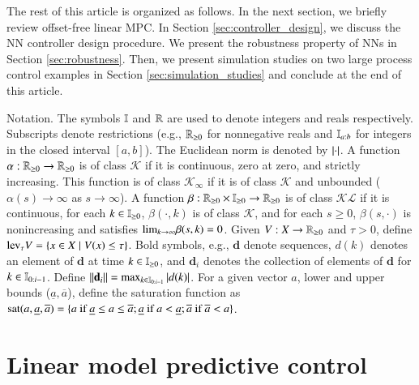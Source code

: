 \documentclass[preprint,5p, twocolumn, authoryear]{elsarticle}
\begin{document}
The rest of this article is organized as follows. 
In the next section, we briefly review 
offset-free linear MPC. 
In Section \ref{sec:controller_design},
we discuss the NN 
controller design procedure.
We present the robustness property
of NNs in Section \ref{sec:robustness}.
Then, we present simulation studies
on two large process control examples
in Section \ref{sec:simulation_studies}
and conclude at the end of this article.

Notation. The symbols $\mathbb{I}$ and $\mathbb{R}$ are 
used to denote integers and reals respectively. 
Subscripts denote restrictions 
(e.g., $\mathbb{R}_{\geq 0}$ for nonnegative reals and 
$\mathbb{I}_{a:b}$ for integers in the 
closed interval $[a, b]$). The Euclidean norm 
is denoted by $\left| \cdot \right|$. A function 
$\alpha : \mathbb{R}_{\geq 0} \rightarrow \mathbb{R}_{\geq 0}$
is of class $\mathcal{K}$ if it is continuous, zero 
at zero, and strictly increasing. This function is of class 
$\mathcal{K}_{\infty}$ if it is of class $\mathcal{K}$
and unbounded ($\alpha(s) \rightarrow \infty$ as 
$s \rightarrow \infty$). A function
$\beta : \mathbb{R}_{\geq 0} \times \mathbb{I}_{\geq 0} \rightarrow \mathbb{R}_{\geq 0}$
is of class $\mathcal{KL}$ if it is continuous,
for each $k \in \mathbb{I}_{\geq 0}$, $\beta(\cdot, k)$ is of class $\mathcal{K}$,
and for each $s \geq 0$, $\beta(s, \cdot)$ is nonincreasing
and satisfies $\textnormal{lim}_{k \rightarrow \infty} \beta(s, k) = 0$.
Given $V : X \rightarrow \mathbb{R}_{\geq 0}$ and $\tau > 0$, define 
$\textnormal{lev}_{\tau} V = \{ x \in X \mid V(x) \leq \tau \}$.
Bold symbols, e.g., $\mathbf{d}$ denote sequences, 
$d(k)$ denotes an element of $\mathbf{d}$ at time 
$k \in \mathbb{I}_{\geq 0}$, and $\mathbf{d}_i$ 
denotes the collection of elements of 
$\mathbf{d}$ for $k \in \mathbb{I}_{0:i-1}$.
Define $\left| \left| \mathbf{d}_i \right| \right| = 
\textnormal{max}_{k \in \mathbb{I}_{0:i-1}} \left| d(k) \right|$.
For a given vector $a$, lower and upper bounds 
($\underline{a}, \overline{a}$), define the saturation function 
as $\textnormal{sat}(a, \underline{a}, \overline{a}) = 
\{ a \ \textnormal{if} \ \underline{a} \leq a \leq \overline{a}; 
\underline{a} \ \textnormal{if} \ a < \underline{a};
\overline{a} \ \textnormal{if} \ \overline{a} < a \}$.

\section{Linear model predictive control} \label{sec:mpc}
\end{document}
